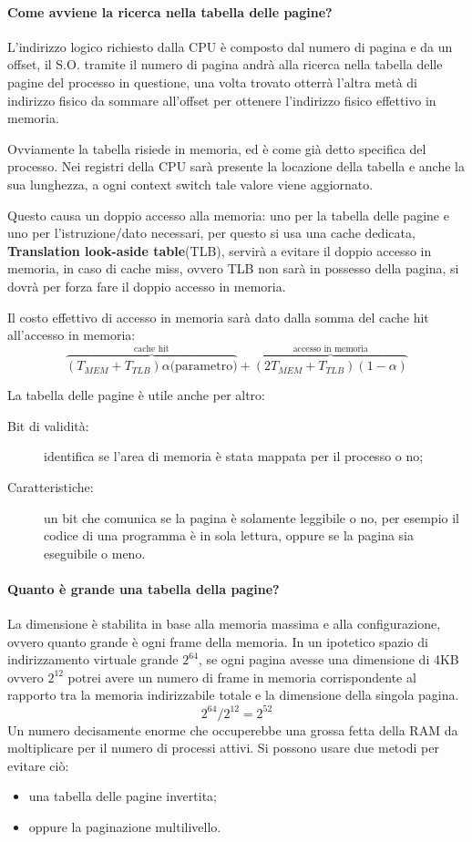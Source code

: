 \documentclass[a4paper, 12pt]{book}
\begin{document}
\paragraph{Come avviene la ricerca nella tabella delle pagine?}
L'indirizzo logico richiesto dalla CPU è composto dal numero
di pagina e da un offset, il S.O. tramite il numero di pagina 
andrà alla ricerca nella tabella delle pagine del processo
in questione, una volta trovato otterrà l'altra metà di 
indirizzo fisico da sommare all'offset per ottenere 
l'indirizzo fisico effettivo in memoria.

Ovviamente la tabella risiede in memoria, ed è come già detto 
specifica del processo. Nei registri della CPU sarà presente 
la locazione della tabella e anche la sua lunghezza, a ogni context 
switch tale valore viene aggiornato.

Questo causa un doppio accesso alla memoria: uno per 
la tabella delle pagine e uno per l'istruzione/dato necessari, per 
questo si usa una cache dedicata, \textbf{Translation look-aside table}(TLB), 
servirà a evitare il doppio accesso in memoria, in caso 
di cache miss, ovvero TLB non sarà in possesso della pagina, si 
dovrà per forza fare il doppio accesso in memoria.

Il costo effettivo di accesso in memoria sarà dato dalla 
somma del cache hit all'accesso in memoria:
\[
    \overbrace{(T_{MEM} + T_{TLB})\alpha\textrm{(parametro)}}^{\textrm{cache hit}} + \overbrace{(2T_{MEM} + T_{TLB})(1 - \alpha)}^{\textrm{accesso in memoria}}
\]

La tabella delle pagine è utile anche per altro:
\begin{description}
    \item[Bit di validità:] identifica se l'area di memoria 
    è stata mappata per il processo o no;
    \item[Caratteristiche:] un bit che comunica se la pagina
    è solamente leggibile o no, per esempio il codice di una programma
    è in sola lettura, oppure se la pagina sia eseguibile o meno.
\end{description}

\paragraph{Quanto è grande una tabella della pagine?}
La dimensione è stabilita in base alla memoria massima e alla configurazione,
ovvero quanto grande è ogni frame della memoria. In un ipotetico spazio di indirizzamento
virtuale grande $2^{64}$, se ogni pagina avesse una dimensione di 4KB ovvero $2^{12}$ potrei 
avere un numero di frame in memoria corrispondente al rapporto tra la memoria indirizzabile totale e
la dimensione della singola pagina. 
\[
    2^{64} / 2^{12} = 2^{52}
\]
Un numero decisamente enorme che occuperebbe una grossa fetta della RAM da moltiplicare per il 
numero di processi attivi. Si possono usare due metodi per evitare ciò:
\begin{itemize}
    \item una tabella delle pagine invertita;
    \item oppure la paginazione multilivello.
\end{itemize}
\end{document}
